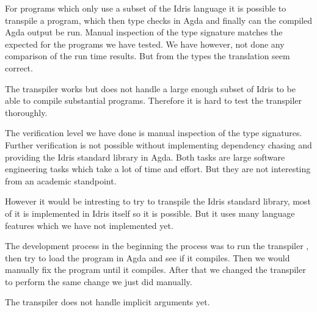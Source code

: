 
For programs which only use a subset of the Idris
language it is possible to transpile a program, which then type checks in Agda
and finally can the compiled Agda output be run. Manual inspection of the type
signature matches the expected for the programs we have tested. We have
however, not done any comparison of the run time results. But from the types
the translation seem correct.

The transpiler works but does not handle a large enough subset of Idris to be
able to compile substantial programs. Therefore it is hard to test the
transpiler thoroughly.


The verification level we have done is manual inspection of the type
signatures. Further verification is not possible without implementing
dependency chasing and providing the Idris standard library in Agda. Both tasks
are large software engineering tasks which take a lot of time and effort. But
they are not interesting from an academic standpoint.

However it would be intresting to try to transpile the Idris standard library,
most of it is implemented in Idris itself so it is possible. But it uses many
language features which we have not implemented yet.

The development process in the beginning the process was to run the transpiler
, then try to load the program in Agda and see if it compiles.  Then we would
manually fix the program until it compiles.  After that we changed the
transpiler to perform the same change we just did manually.


The transpiler does not handle implicit arguments yet.

